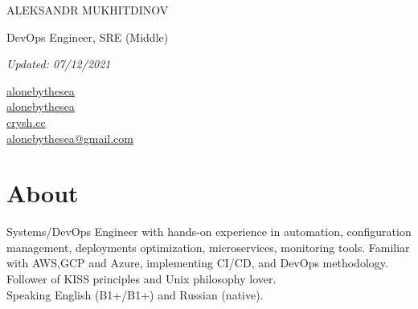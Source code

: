 \documentclass[11pt]{letter}
\newcommand{\forceindent}{\leavevmode{\parindent=1em\indent} %
}
\begin{document}
\begin{spacing}{2}
    {\centerline{{\huge \vphantom{Name}ALEKSANDR MUKHITDINOV}}}
    {\centerline{\large \vphantom{Position}DevOps Engineer, SRE (Middle)}}
    {\centerline{\textit{Updated: 07/12/2021}}}
\end{spacing}

{\setlength{\columnsep}{-0.9cm}\begin{multicols}{4}
    \begin{spacing}{2}\rmfamily
    \large{
        \vphantom{contacts}
        \faLinkedin \href{https://www.linkedin.com/in/alonebythesea}{\vphantom{LinkedIn} alonebythesea} \\
        \columnbreak
        \faGithubAlt \href{https://github.com/alonebythesea}{\vphantom{GitHub} alonebythesea} \\
        \columnbreak
        \faLink \href{https://crysh.cc}{\vphantom{Website} crysh.cc} \\
        \columnbreak
        \faEnvelope \href{mailto:alonebythesea@gmail.com}{\vphantom{Email} alonebythesea@gmail.com} \\
        \columnbreak
    }
  \end{spacing}\end{multicols}}

\section*{About\vphantom{about}}


\forceindent Systems/DevOps Engineer with hands-on experience in automation, configuration management, deployments optimization, microservices, monitoring tools. Familiar with AWS,GCP and Azure, implementing CI/CD, and DevOps methodology. Follower of KISS principles and Unix philosophy lover. \\


\forceindent Speaking English (B1+/B1+) and Russian (native).

\end{document}
